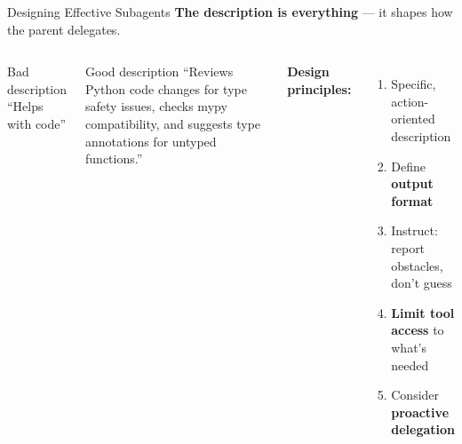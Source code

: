 \documentclass[aspectratio=169]{beamer}
\begin{document}
\begin{frame}{Designing Effective Subagents}
\textbf{\color{popblue}The description is everything} --- it shapes how the parent delegates.

\bigskip
\begin{columns}[T]
\begin{alertblock}{Bad description}
``Helps with code''
\end{alertblock}
\begin{exampleblock}{Good description}
``Reviews Python code changes for type safety issues, checks mypy compatibility, and suggests type annotations for untyped functions.''
\end{exampleblock}

\textbf{Design principles:}
\begin{enumerate}
  \item Specific, action-oriented description
  \item Define \textbf{output format}
  \item Instruct: report obstacles,\\don't guess
  \item \textbf{Limit tool access} to what's needed
  \item Consider \textbf{proactive delegation}
\end{enumerate}
\end{columns}
\end{frame}
\end{document}
